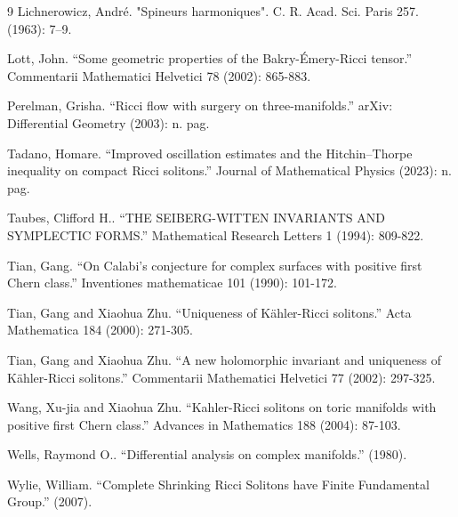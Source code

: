\documentclass[openany, amssymb, psamsfonts]{amsart}
\theoremstyle{definition}
\numberwithin{equation}{section}
\begin{document}
\begin{thebibliography}{9}
Lichnerowicz, André. "Spineurs harmoniques". C. R. Acad. Sci. Paris 257. (1963): 7–9.

Lott, John. “Some geometric properties of the Bakry-Émery-Ricci tensor.” Commentarii Mathematici Helvetici 78 (2002): 865-883.

Perelman, Grisha. “Ricci flow with surgery on three-manifolds.” arXiv: Differential Geometry (2003): n. pag.

Tadano, Homare. “Improved oscillation estimates and the Hitchin–Thorpe inequality on compact Ricci solitons.” Journal of Mathematical Physics (2023): n. pag.

Taubes, Clifford H.. “THE SEIBERG-WITTEN INVARIANTS AND SYMPLECTIC FORMS.” Mathematical Research Letters 1 (1994): 809-822.

Tian, Gang. “On Calabi's conjecture for complex surfaces with positive first Chern class.” Inventiones mathematicae 101 (1990): 101-172.

Tian, Gang and Xiaohua Zhu. “Uniqueness of Kähler-Ricci solitons.” Acta Mathematica 184 (2000): 271-305.

Tian, Gang and Xiaohua Zhu. “A new holomorphic invariant and uniqueness of Kähler-Ricci solitons.” Commentarii Mathematici Helvetici 77 (2002): 297-325.

Wang, Xu-jia and Xiaohua Zhu. “Kahler-Ricci solitons on toric manifolds with positive first Chern class.” Advances in Mathematics 188 (2004): 87-103.

Wells, Raymond O.. “Differential analysis on complex manifolds.” (1980).

Wylie, William. “Complete Shrinking Ricci Solitons have Finite Fundamental Group.” (2007).

\end{thebibliography}
 
\end{document}

